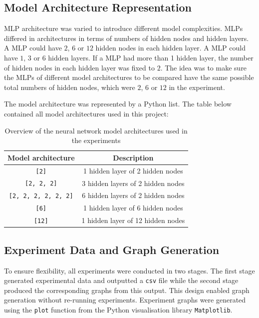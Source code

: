\subsection{Model Architecture Representation}
MLP architecture was varied to introduce different model complexities. MLPs differed in architectures in terms of numbers of hidden nodes and hidden layers. A MLP could have $2$, $6$ or $12$ hidden nodes in each hidden layer. A MLP could have $1$, $3$ or $6$ hidden layers. If a MLP had more than 1 hidden layer, the number of hidden nodes in each hidden layer was fixed to $2$. The idea was to make sure the MLPs of different model architectures to be compared have the same possible total numbers of hidden nodes, which were $2$, $6$ or $12$ in the experiment. 

The model architecture was represented by a Python list. The table below contained all model architectures used in this project: 

\begin{table}[H]
    \centering
    \begin{tabular}{|c|c|}
        \hline
        Model architecture & Description \\
        \hline
        \small\texttt{[2]} & 1 hidden layer of 2 hidden nodes \\
        \hline
        \small\texttt{[2, 2, 2]} & 3 hidden layers of 2 hidden nodes \\
        \hline
        \small\texttt{[2, 2, 2, 2, 2, 2]} & 6 hidden layers of 2 hidden nodes \\
        \hline
        \small\texttt{[6]} & 1 hidden layer of 6 hidden nodes \\
        \hline
        \small\texttt{[12]} & 1 hidden layer of 12 hidden nodes \\
        \hline
    \end{tabular}
    \caption{Overview of the neural network model architectures used in the experiments}
    \label{table:background_model_architecture}
\end{table}


\subsection{Experiment Data and Graph Generation}
To ensure flexibility, all experiments were conducted in two stages. The first stage generated experimental data and outputted a \texttt{csv} file while the second stage produced the corresponding graphs from this output. This design enabled graph generation without re-running experiments. Experiment graphs were generated using the \texttt{plot} function from the Python visualisation library \texttt{Matplotlib}. 


